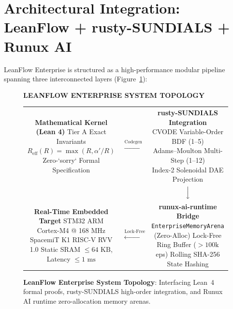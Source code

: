 \documentclass[10pt,twocolumn]{article}
\begin{document}
\section{Architectural Integration: LeanFlow + rusty-SUNDIALS + Runux AI}

LeanFlow Enterprise is structured as a high-performance modular pipeline spanning three interconnected layers (Figure~\ref{fig:architecture}):

\begin{figure}[t]
\centering
\begin{tcolorbox}[colback=white,colframe=entnavy,arc=2pt,boxrule=0.5pt]
\centering
\small
\textbf{LEANFLOW ENTERPRISE SYSTEM TOPOLOGY}
\vspace{0.2cm}

\begin{tabular}{ccc}
\fbox{\parbox{4.8cm}{\centering \textbf{Mathematical Kernel (Lean 4)}\\[3pt] \scriptsize Tier A Exact Invariants\\ $R_{\text{eff}}(R) = \max(R, \alpha'/R)$\\ Zero-`sorry` Formal Specification}} 
& $\xrightarrow{\text{Codegen / C-ABI}}$ &
\fbox{\parbox{4.8cm}{\centering \textbf{rusty-SUNDIALS Integration}\\[3pt] \scriptsize CVODE Variable-Order BDF (1--5)\\ Adams--Moulton Multi-Step (1--12)\\ Index-2 Solenoidal DAE Projection}} \\
& & $\Big\downarrow$ \\
\fbox{\parbox{4.8cm}{\centering \textbf{Real-Time Embedded Target}\\[3pt] \scriptsize STM32 ARM Cortex-M4 @ 168 MHz\\ SpacemiT K1 RISC-V RVV 1.0\\ Static SRAM $\le 64\text{ KB}$, Latency $\le 1\text{ ms}$}}
& $\xleftarrow{\text{Lock-Free Bridge}}$ &
\fbox{\parbox{4.8cm}{\centering \textbf{runux-ai-runtime Bridge}\\[3pt] \scriptsize \texttt{EnterpriseMemoryArena} (Zero-Alloc)\\ Lock-Free Ring Buffer ($> 100\text{k}$ eps)\\ Rolling SHA-256 State Hashing}}
\end{tabular}
\end{tcolorbox}
\caption{\textbf{LeanFlow Enterprise System Topology}: Interfacing Lean~4 formal proofs, rusty-SUNDIALS high-order integration, and Runux AI runtime zero-allocation memory arenas.}
\label{fig:architecture}
\end{figure}
\end{document}
